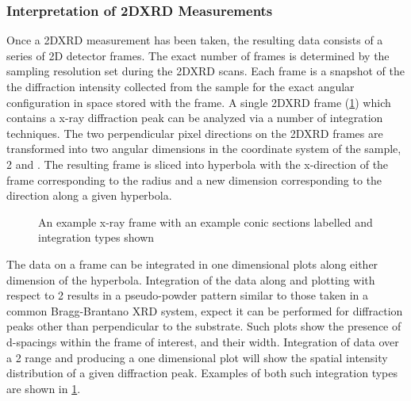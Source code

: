 
\subsubsection{Interpretation of 2DXRD Measurements}
Once a 2DXRD measurement has been taken, the resulting data consists of a series of 2D detector frames. The exact number of frames is determined by the sampling resolution set during the 2DXRD scans. Each frame is a snapshot of the the diffraction intensity collected from the sample for the exact angular configuration in space stored with the frame. A single 2DXRD frame (\cref{fig:exp_xray_frame}) which contains a x-ray diffraction peak can be analyzed via a number of integration techniques. The two perpendicular pixel directions on the 2DXRD frames are transformed into two angular dimensions in the coordinate system of the sample, 2\texttheta{} and \textchi \cite{bobhe}. The resulting frame is sliced into hyperbola with the x-direction of the frame corresponding to the radius and a new dimension \textchi{} corresponding to the direction along a given hyperbola.
\begin{figure}
    \centering
    \caption{\label{fig:exp_xray_frame}An example x-ray frame with an example conic sections labelled and integration types shown}
\end{figure}

The data on a frame can be integrated in one dimensional plots along either dimension of the hyperbola. Integration of the data along \textchi{} and plotting with respect to 2\texttheta{} results in a pseudo-powder pattern similar to those taken in a common Bragg-Brantano XRD system, expect it can be performed for diffraction peaks other than perpendicular to the substrate. Such plots show the presence of d-spacings within the frame of interest, and their width. Integration of data over a 2\texttheta{} range and producing a one dimensional plot will show the spatial intensity distribution of a given diffraction peak. Examples of both such integration types are shown in \cref{fig:exp_xray_frame}.

